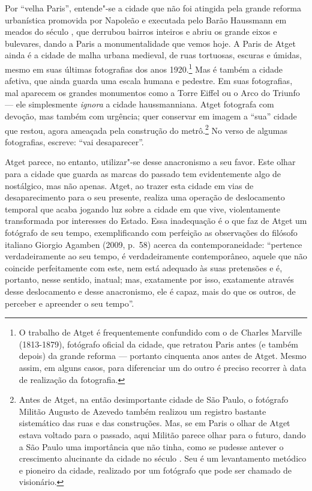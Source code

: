Por ``velha Paris'', entende"-se a cidade que não foi atingida pela
grande reforma urbanística promovida por Napoleão  e executada pelo
Barão Haussmann em meados do século , que derrubou bairros inteiros e
abriu os grande eixos e bulevares, dando a Paris a monumentalidade que
vemos hoje. A Paris de Atget ainda é a cidade de malha urbana medieval,
de ruas tortuosas, escuras e úmidas, mesmo em suas últimas fotografias
dos anos 1920.\footnote{O trabalho de Atget é frequentemente confundido
  com o de Charles Marville (1813-1879), fotógrafo oficial da cidade, que
  retratou Paris antes (e também depois) da grande reforma --- portanto
  cinquenta anos antes de Atget. Mesmo assim, em alguns casos, para
  diferenciar um do outro é preciso recorrer à data de realização da
  fotografia.} Mas é também a cidade afetiva, que ainda guarda uma
escala humana e pedestre. Em suas fotografias, mal aparecem os grandes
monumentos como a Torre Eiffel ou o Arco do Triunfo --- ele simplesmente
\emph{ignora} a cidade haussmanniana. Atget fotografa com devoção, mas
também com urgência; quer conservar em imagem a ``sua'' cidade que
restou, agora ameaçada pela construção do metrô.\footnote{Antes de
  Atget, na então desimportante cidade de São Paulo, o fotógrafo Militão
  Augusto de Azevedo também realizou um registro bastante sistemático
  das ruas e das construções. Mas, se em Paris o olhar de Atget estava
  voltado para o passado, aqui Militão parece olhar para o futuro, dando
  a São Paulo uma importância que não tinha, como se pudesse antever o
  crescimento alucinante da cidade no século . Seu {} é um levantamento
  metódico e pioneiro da cidade, realizado por um fotógrafo que pode ser
  chamado de visionário.} No verso de algumas fotografias, escreve:
``vai desaparecer''.

Atget parece, no entanto, utilizar"-se desse anacronismo a seu favor.
Este olhar para a cidade que guarda as marcas do passado tem
evidentemente algo de nostálgico, mas não apenas. Atget, ao trazer esta
cidade em vias de desaparecimento para o seu presente, realiza uma
operação de deslocamento temporal que acaba jogando luz sobre a cidade
em que vive, violentamente transformada por interesses do Estado. Essa
inadequação é o que faz de Atget um fotógrafo de seu tempo,
exemplificando com perfeição as observações do filósofo italiano Giorgio
Agamben (2009, p.~58) acerca da contemporaneidade: ``pertence
verdadeiramente ao seu tempo, é verdadeiramente contemporâneo, aquele
que não coincide perfeitamente com este, nem está adequado às suas
pretensões e é, portanto, nesse sentido, inatual; mas, exatamente por
isso, exatamente através desse deslocamento e desse anacronismo, ele é
capaz, mais do que os outros, de perceber e apreender o seu tempo''.

